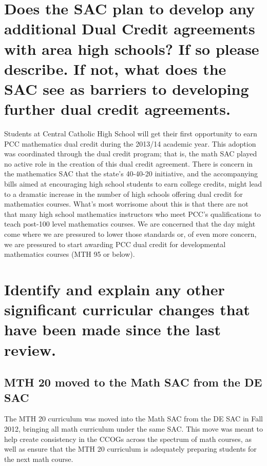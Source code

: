 \section[Future dual credit relationships]{Does the SAC plan to develop any
additional Dual Credit agreements with area high schools?  If so please
describe.   If not, what does the SAC see as barriers to developing further dual
credit agreements. }
Students at Central Catholic High School will get their first opportunity to
earn PCC mathematics dual credit during the 2013/14 academic year.  This
adoption was coordinated through the dual credit program; that is, the math SAC
played no active role in the creation of this dual credit agreement.
There is concern in the mathematics SAC that the state's 40-40-20 initiative, and the accompanying bills aimed at encouraging high school students to earn college credits, might lead to a dramatic increase in the number of high schools offering dual credit for mathematics courses.  What's most worrisome about this is that there are not that many high school mathematics instructors who meet PCC's qualifications to teach post-100 level mathematics courses.  We are concerned that the day might come where we are pressured to lower those standards or, of even more concern, we are pressured to start awarding PCC dual credit for developmental mathematics courses (MTH 95 or below).


\section[Other significant curricular changes]{Identify and explain any other
significant curricular changes that have been made since the last
review.}\label{cur:sec:other}

\subsection{MTH 20 moved to the Math SAC from the DE SAC}
The MTH 20 curriculum was moved into the Math SAC from the DE SAC in Fall 2012,
bringing all math curriculum under the same SAC.  This move was meant to help
create consistency in the CCOGs across the spectrum of math courses, as well as
ensure that the MTH 20 curriculum is adequately preparing students for the next
math course.

